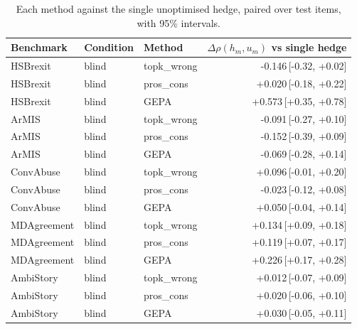 \begin{table}[t]
\centering
\small
\begin{tabular}{lllr}
\hline
Benchmark & Condition & Method & $\Delta\rho(h_m,u_m)$ vs single hedge \\
\hline
HSBrexit & blind & topk\_wrong & -0.146{\scriptsize\,[-0.32, +0.02]} \\
HSBrexit & blind & pros\_cons & +0.020{\scriptsize\,[-0.18, +0.22]} \\
HSBrexit & blind & GEPA & +0.573{\scriptsize\,[+0.35, +0.78]} \\
ArMIS & blind & topk\_wrong & -0.091{\scriptsize\,[-0.27, +0.10]} \\
ArMIS & blind & pros\_cons & -0.152{\scriptsize\,[-0.39, +0.09]} \\
ArMIS & blind & GEPA & -0.069{\scriptsize\,[-0.28, +0.14]} \\
ConvAbuse & blind & topk\_wrong & +0.096{\scriptsize\,[-0.01, +0.20]} \\
ConvAbuse & blind & pros\_cons & -0.023{\scriptsize\,[-0.12, +0.08]} \\
ConvAbuse & blind & GEPA & +0.050{\scriptsize\,[-0.04, +0.14]} \\
MDAgreement & blind & topk\_wrong & +0.134{\scriptsize\,[+0.09, +0.18]} \\
MDAgreement & blind & pros\_cons & +0.119{\scriptsize\,[+0.07, +0.17]} \\
MDAgreement & blind & GEPA & +0.226{\scriptsize\,[+0.17, +0.28]} \\
AmbiStory & blind & topk\_wrong & +0.012{\scriptsize\,[-0.07, +0.09]} \\
AmbiStory & blind & pros\_cons & +0.020{\scriptsize\,[-0.06, +0.10]} \\
AmbiStory & blind & GEPA & +0.030{\scriptsize\,[-0.05, +0.11]} \\
\hline
\end{tabular}
\caption{Each method against the single unoptimised hedge, paired over test items, with 95\% intervals.}
\label{tab:paired-methods}
\end{table}